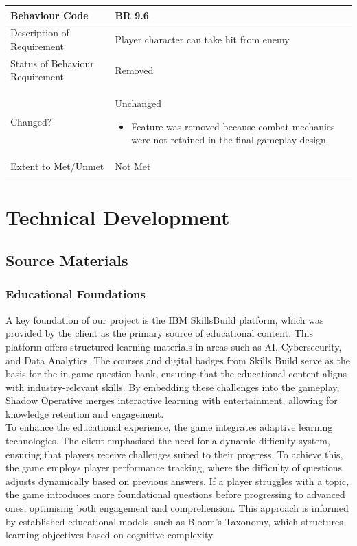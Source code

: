 \documentclass[11pt, a4paper]{article}
\begin{document}
\begin{center}
\begin{tabularx}{\linewidth}{|>{\raggedright\arraybackslash}m{4cm}|X|}
    \hline
    Behaviour Code & \textbf{BR 9.6} \\
    \hline
    Description of Requirement & Player character can take hit from enemy \\
    \hline
    Status of Behaviour Requirement & Removed \\
    \hline
    Changed? &
    Unchanged
    \begin{itemize}
        \item Feature was removed because combat mechanics were not retained in the final gameplay design.
    \end{itemize}\\
    \hline
    Extent to Met/Unmet & Not Met \\
    \hline
\end{tabularx}
\end{center}

\newpage

\section{Technical Development}

\subsection{Source Materials}

\subsubsection{Educational Foundations}

\noindent A key foundation of our project is the IBM SkillsBuild platform, which was provided by the client as the primary source of educational content. This platform offers structured learning materials in areas such as AI, Cybersecurity, and Data Analytics. The courses and digital badges from Skills Build serve as the basis for the in-game question bank, ensuring that the educational content aligns with industry-relevant skills. By embedding these challenges into the gameplay, Shadow Operative merges interactive learning with entertainment, allowing for knowledge retention and engagement. \\

\noindent To enhance the educational experience, the game integrates adaptive learning technologies. The client emphasised the need for a dynamic difficulty system, ensuring that players receive challenges suited to their progress. To achieve this, the game employs player performance tracking, where the difficulty of questions adjusts dynamically based on previous answers. If a player struggles with a topic, the game introduces more foundational questions before progressing to advanced ones, optimising both engagement and comprehension. This approach is informed by established educational models, such as Bloom’s Taxonomy, which structures learning objectives based on cognitive complexity. \\
\end{document}
